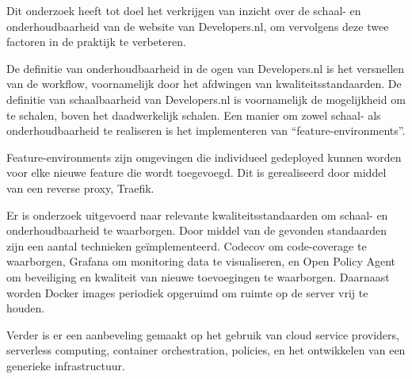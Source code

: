 \documentclass[
11pt, %
oneside, %
english, %
singlespacing, %
parskip, %
headsepline, %
]{formatting} %
\begin{document}

\begin{samenvatting}
Dit onderzoek heeft tot doel het verkrijgen van inzicht over de schaal- en onderhoudbaarheid van de website van Developers.nl, om vervolgens deze twee factoren in de praktijk te verbeteren.

De definitie van onderhoudbaarheid in de ogen van Developers.nl is het versnellen van de workflow, voornamelijk door het afdwingen van kwaliteitsstandaarden. De definitie van schaalbaarheid van Developers.nl is voornamelijk de mogelijkheid om te schalen, boven het daadwerkelijk schalen. Een manier om zowel schaal- als onderhoudbaarheid te realiseren is het implementeren van \enquote{feature-environments}. 

Feature-environments zijn omgevingen die individueel gedeployed kunnen worden voor elke nieuwe feature die wordt toegevoegd. Dit is gerealiseerd door middel van een reverse proxy, Traefik.

Er is onderzoek uitgevoerd naar relevante kwaliteitsstandaarden om schaal- en onderhoudbaarheid te waarborgen. Door middel van de gevonden standaarden zijn een aantal technieken geïmplementeerd. Codecov om code-coverage te waarborgen, Grafana om monitoring data te visualiseren, en Open Policy Agent om beveiliging en kwaliteit van nieuwe toevoegingen te waarborgen. Daarnaast worden Docker images periodiek opgeruimd om ruimte op de server vrij te houden.

Verder is er een aanbeveling gemaakt op het gebruik van cloud service providers, serverless computing, container orchestration, policies, en het ontwikkelen van een generieke infrastructuur.
\end{samenvatting}

\end{document}
